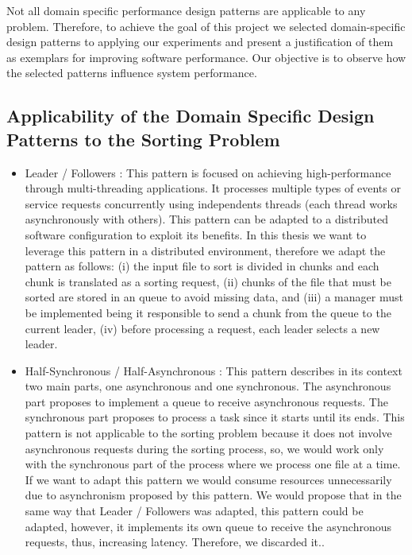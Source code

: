 Not all domain specific performance design patterns are applicable to any problem. Therefore, to achieve the goal of this project we selected domain-specific design patterns to applying our experiments and present a justification of them as exemplars for improving software performance. Our objective is to observe how the selected patterns influence system performance.

\subsection{Applicability of the Domain Specific Design Patterns to the Sorting Problem}

\begin{itemize}
	
	\item Leader / Followers : This pattern is focused on achieving high-performance through multi-threading applications. It processes multiple types of events or service requests concurrently using independents threads (each thread works asynchronously with others). This pattern can be adapted to a distributed software configuration to exploit its benefits. In this thesis we want to leverage this pattern in a distributed environment, therefore we adapt the pattern as follows: (i) the input file to sort is divided in chunks and each chunk is translated as a sorting request, (ii) chunks of the file that must be sorted are stored in an queue to avoid missing data, and (iii) a manager must be implemented being it responsible to send a chunk from the queue to the current leader, (iv) before processing a request, each leader selects a new leader.
	
	\item Half-Synchronous / Half-Asynchronous : This pattern describes in its context two main parts, one asynchronous and one synchronous. The asynchronous part proposes to implement a queue to receive asynchronous requests. The synchronous part proposes to process a task since it starts until its ends.  This pattern is not applicable to the sorting problem because it does not involve asynchronous requests during the sorting process, so,  we would work only with the synchronous part of the process where we process one file at a time. If we want to adapt this pattern we would consume resources unnecessarily due to asynchronism proposed by this pattern. We would propose that in the same way that Leader / Followers was adapted, this pattern could be adapted, however, it implements its own queue to receive the asynchronous requests, thus, increasing latency. Therefore, we discarded it..
	

\end{itemize}
